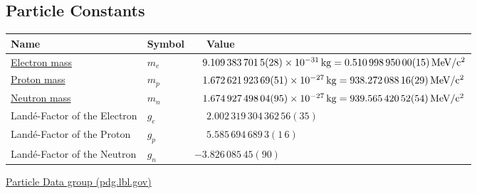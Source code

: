 	\subsection{Particle Constants}
		\label{Sec:ParticleConstants}
		\begin{center}
		\begin{tabular}{| L{.35\textwidth} L{.15\textwidth} L{.4\textwidth} |}
			\hline Name & Symbol & $\phantom{-}$Value \\ \hline \hline
			\href{https://en.wikipedia.org/wiki/Electron_mass}{Electron mass} & $m_e$ & $\phantom{-}9.109\,383\,701\,5(28)\times 10^{-31}\,\mathrm{kg} = 0.510\,998\,950\,00(15)\,\mathrm{MeV/c^2}$ \\ \hline
			\href{https://en.wikipedia.org/wiki/Proton}{Proton mass} & $m_p$ & $\phantom{-}1.672\,621\,923\,69(51)\times 10^{-27}\,\mathrm{kg} = 938.272\,088\,16(29)\,\mathrm{MeV/c^2}$ \\ \hline
			\href{https://en.wikipedia.org/wiki/Neutron}{Neutron mass} & $m_n$ & $\phantom{-}1.674\,927\,498\, 04(95)\times 10^{-27}\,\mathrm{kg} = 939.565\,420\,52(54)\,\mathrm{MeV/c^2}$ \\ \hline
			Landé-Factor of the Electron & $g_e$ & $\phantom{-}2.002\,319\,304\,362\,56(35)$ \\ \hline
			Landé-Factor of the Proton & $g_p$ & $\phantom{-}5.585\,694\,689\,3(1\,6)$ \\ \hline
			Landé-Factor of the Neutron & $g_n$ & $- 3.826\,085\,45(90)$ \\ \hline
		\end{tabular}
		\end{center}

		\href{https://pdg.lbl.gov/}{Particle Data group (pdg.lbl.gov)}

	\renewcommand{\arraystretch}{2.0}
